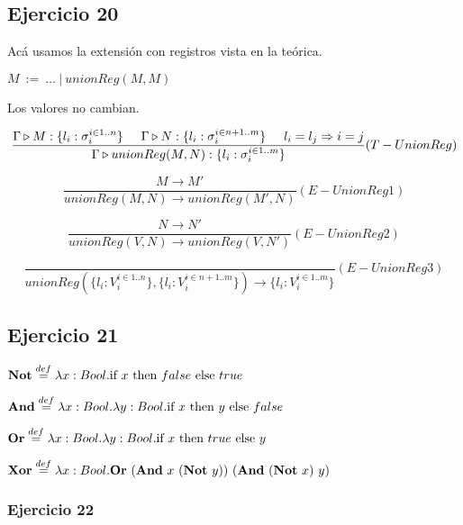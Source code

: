 \documentclass[10pt,a4paper, landscape]{article}
\begin{document}
\newpage
\subsection{Ejercicio 20}
Acá usamos la extensión con registros vista en la teórica.

$M~:=~\dots~|~unionReg(M,M)$

Los valores no cambian.

$$\frac{\Gamma\triangleright M : \{l_i:\sigma_i^{i\in 1..n}\}\hspace*{5mm}\Gamma\triangleright N : \{l_i:\sigma_i^{i\in n+1..m}\}\hspace*{5mm}l_i=l_j \Rightarrow i = j}{\Gamma\triangleright unionReg(M,N) : \{l_i:\sigma_i^{i\in 1..m}\}}(T-UnionReg)$$

\begin{multicols}{2}

\vspace*{5mm}
$$\frac{M\to M'}{unionReg(M,N)\to unionReg(M',N)}(E-UnionReg1)$$

\vspace*{5mm}
$$\frac{N\to N'}{unionReg(V,N)\to unionReg(V,N')}(E-UnionReg2)$$

\vspace*{5mm}
$$\frac{}{unionReg(\{l_i:V_i^{i\in 1..n}\},\{l_i:V_i^{i\in n+1..m}\})\to \{l_i:V_i^{i\in 1..m}\}}(E-UnionReg3)$$
\end{multicols}

\subsection{Ejercicio 21}
\begin{multicols}{2}
$\textbf{Not} \overset{def}{=} \lambda x: Bool \text{.} \text{if } x \text{ then } false \text{ else } true$

\vspace*{5mm}
$\textbf{And} \overset{def}{=} \lambda x: Bool \text{.} \lambda y: Bool \text{.} \text{if } x \text{ then } y \text{ else } false$

\vfill

$\textbf{Or} \overset{def}{=} \lambda x: Bool \text{.} \lambda y: Bool \text{.} \text{if } x \text{ then } true \text{ else } y$

\vspace*{5mm}
$\textbf{Xor} \overset{def}{=} \lambda x: Bool \text{.} \textbf{Or}~(\textbf{And}~x~(\textbf{Not}~y))~(\textbf{And}~(\textbf{Not}~x)~y)$
\end{multicols}

\subsubsection*{Ejercicio 22}
\end{document}
